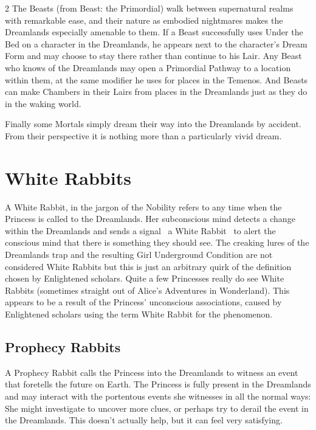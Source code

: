 \begin{multicols}{2}
The Beasts (from Beast: the Primordial) walk between supernatural realms with remarkable ease, and their nature as embodied nightmares makes the Dreamlands especially amenable to them. If a Beast successfully uses Under the Bed on a character in the Dreamlands, he appears next to the character’s Dream Form and may choose to stay there rather than continue to his Lair. Any Beast who knows of the Dreamlands may open a Primordial Pathway to a location within them, at the same modifier he uses for places in the Temenos. And Beasts can make Chambers in their Lairs from places in the Dreamlands just as they do in the waking world.



Finally some Mortals simply dream their way into the Dreamlands by accident. From their perspective it is nothing more than a particularly vivid dream.

\bigsidebarend

\section*{White Rabbits}

A White Rabbit, in the jargon of the Nobility refers to any time when the Princess is called to the Dreamlands. Her subconscious mind detects a change within the Dreamlands and sends a signal \textendash\, a White Rabbit \textendash\, to alert the conscious mind that there is something they should see. The creaking lures of the Dreamlands trap and the resulting Girl Underground Condition are not considered White Rabbits but this is just an arbitrary quirk of the definition chosen by Enlightened scholars. Quite a few Princesses really do see White Rabbits (sometimes straight out of Alice's Adventures in Wonderland). This appears to be a result of the Princess' unconscious associations, caused by Enlightened scholars using the term White Rabbit for the phenomenon.

\subsection*{Prophecy Rabbits}

A Prophecy Rabbit calls the Princess into the Dreamlands to witness an event that foretells the future on Earth. The Princess is fully present in the Dreamlands and may interact with the portentous events she witnesses in all the normal ways: She might investigate to uncover more clues, or perhaps try to derail the event in the Dreamlands. This doesn’t actually help, but it can feel very satisfying.


\end{multicols}
